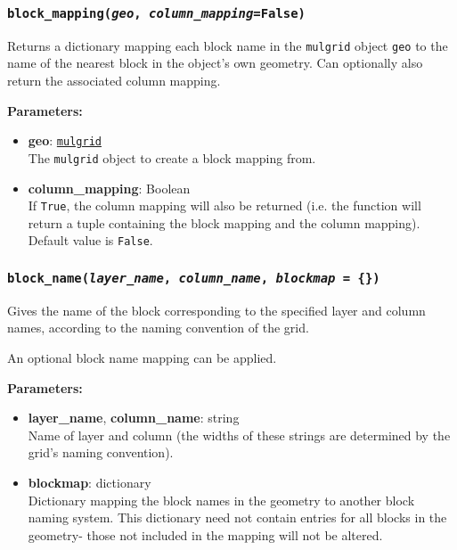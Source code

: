 \begin{snugshade}\subsubsection{\texttt{block\_mapping(\emph{geo}, \emph{column\_mapping}=\texttt{False})}}\end{snugshade}
\label{sec:mulgrid:block_mapping}

Returns a dictionary mapping each block name in the \texttt{mulgrid} object \texttt{geo} to the name of the nearest block in the object's own geometry.  Can optionally also return the associated column mapping.

\textbf{Parameters:}
\begin{itemize}
\item \textbf{geo}: \hyperref[mulgrids]{\texttt{mulgrid}}\\
  The \texttt{mulgrid} object to create a block mapping from.
\item \textbf{column\_mapping}: Boolean\\
  If \texttt{True}, the column mapping will also be returned (i.e. the function will return a tuple containing the block mapping and the column mapping).  Default value is \texttt{False}.
\end{itemize}

\begin{snugshade}\subsubsection{\texttt{block\_name(\emph{layer\_name}, \emph{column\_name}, \emph{blockmap} = \{\})}}\end{snugshade}
\label{sec:mulgrid:block_name}

Gives the name of the block corresponding to the specified layer and column names, according to the naming convention of the grid.

An optional block name mapping can be applied.

\textbf{Parameters:}
\begin{itemize}
\item \textbf{layer\_name}, \textbf{column\_name}: string\\
  Name of layer and column (the widths of these strings are determined by the grid's naming convention).
\item \textbf{blockmap}: dictionary\\
  Dictionary mapping the block names in the geometry to another block naming system. This dictionary need not contain entries for all blocks in the geometry- those not included in the mapping will not be altered.
\end{itemize}

